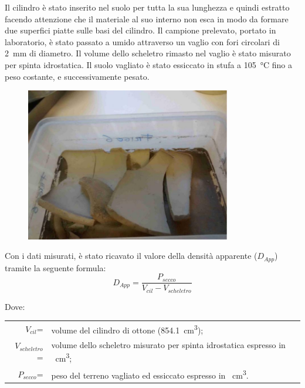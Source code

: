 \documentclass[11pt, a4paper, openright, titlepage, final, language = italian]{book}
\begin{document}
Il cilindro \`e stato inserito nel suolo per tutta la sua lunghezza e
quindi estratto facendo attenzione che il materiale al suo interno non
esca in modo da formare due superfici piatte sulle basi del cilindro.
Il campione prelevato, portato in laboratorio, \`e stato passato a
umido attraverso un vaglio con fori circolari di \SI{2}{\milli\metre}
di diametro. Il volume dello scheletro rimasto nel vaglio \`e stato
misurato per spinta idrostatica.  Il suolo vagliato
\`e stato essiccato in stufa a \SI{105}{\celsius} fino a peso
costante, e successivamente pesato. 

\begin{figure}[ht]
  \centering
  \includegraphics[width=0.8\textwidth]{../foto/secco.jpeg}
  \caption{\label{fig:secco}}
\end{figure}
Con i dati misurati, \`e stato ricavato il valore della densit\`a
apparente ($D_{App}$) tramite la seguente formula:
\begin{equation}
  \label{eq:DensitaApparente}
  D_{App}=\frac{P_{secco}}{V_{cil}-V_{scheletro}}
\end{equation}

Dove:\\
\begin{tabular}{rp{12cm}}
  $V_{cil}$=       & volume del cilindro di ottone (\SI{854.1}{\cubic\centi\metre}); \\
  $V_{scheletro}$=    & volume dello scheletro misurato per spinta
                        idrostatica espresso in \SI{}{\cubic\centi\metre}; \\
  $P_{secco}$=       & peso del terreno vagliato ed essiccato espresso
                       in \SI{}{\cubic\centi\metre}.
\end{tabular}
\vspace*{3em}
\end{document}
